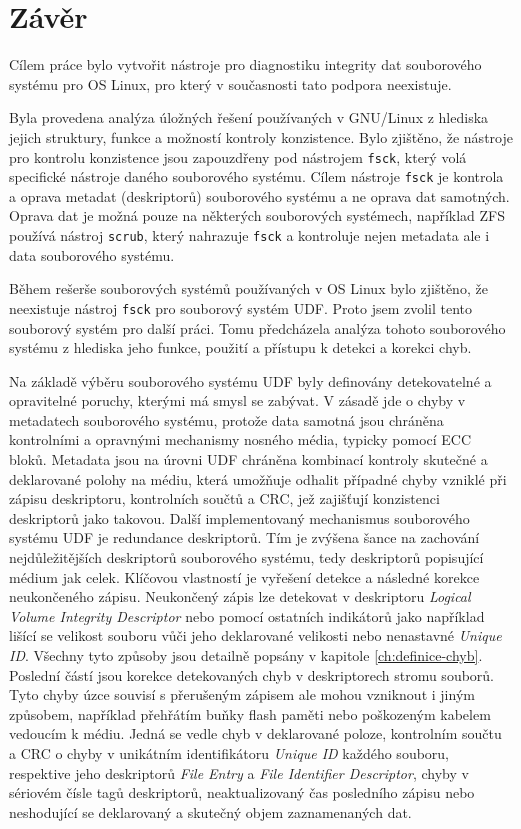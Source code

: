 \chapter{Závěr}
Cílem práce bylo vytvořit nástroje pro diagnostiku integrity dat souborového systému pro OS Linux, pro který v současnosti tato podpora neexistuje.

Byla provedena analýza úložných řešení používaných v GNU/Linux z hlediska jejich struktury, funkce a možností kontroly konzistence. Bylo zjištěno, že nástroje pro kontrolu konzistence jsou zapouzdřeny pod nástrojem \texttt{fsck}, který volá specifické nástroje daného souborového systému. Cílem nástroje \texttt{fsck} je kontrola a oprava metadat (deskriptorů) souborového systému a ne oprava dat samotných. Oprava dat je možná pouze na některých souborových systémech, například ZFS používá nástroj \texttt{scrub}, který nahrazuje \texttt{fsck} a kontroluje nejen metadata ale i data souborového systému.

Během rešerše souborových systémů používaných v OS Linux bylo zjištěno, že neexistuje nástroj \texttt{fsck} pro souborový systém UDF. Proto jsem zvolil tento souborový systém pro další práci. Tomu předcházela analýza tohoto souborového systému z hlediska jeho funkce, použití a přístupu k detekci a korekci chyb.

Na základě výběru souborového systému UDF byly definovány detekovatelné a opravitelné poruchy, kterými má smysl se zabývat. V zásadě jde o chyby v metadatech souborového systému, protože data samotná jsou chráněna kontrolními a opravnými mechanismy nosného média, typicky pomocí ECC bloků. Metadata jsou na úrovni UDF chráněna kombinací kontroly skutečné a deklarované polohy na médiu, která umožňuje odhalit případné chyby vzniklé při zápisu deskriptoru, kontrolních součtů a CRC, jež zajišťují konzistenci deskriptorů jako takovou. Další implementovaný mechanismus souborového systému UDF je redundance deskriptorů. Tím je zvýšena šance na zachování nejdůležitějších deskriptorů souborového systému, tedy deskriptorů popisující médium jak celek. Klíčovou vlastností je vyřešení detekce a následné korekce neukončeného zápisu. Neukončený zápis lze detekovat v deskriptoru \textit{Logical Volume Integrity Descriptor} nebo pomocí ostatních indikátorů jako například lišící se velikost souboru vůči jeho deklarované velikosti nebo nenastavné \textit{Unique ID}. Všechny tyto způsoby jsou detailně popsány v kapitole \ref{ch:definice-chyb}. Poslední částí jsou korekce detekovaných chyb v deskriptorech stromu souborů. Tyto chyby úzce souvisí s přerušeným zápisem ale mohou vzniknout i jiným způsobem, například přehřátím buňky flash paměti nebo poškozeným kabelem vedoucím k médiu. Jedná se vedle chyb v deklarované poloze, kontrolním součtu a CRC o chyby v unikátním identifikátoru \textit{Unique ID} každého souboru, respektive jeho deskriptorů \textit{File Entry} a \textit{File Identifier Descriptor}, chyby v sériovém čísle tagů deskriptorů, neaktualizovaný čas posledního zápisu nebo neshodující se deklarovaný a skutečný objem zaznamenaných dat.

